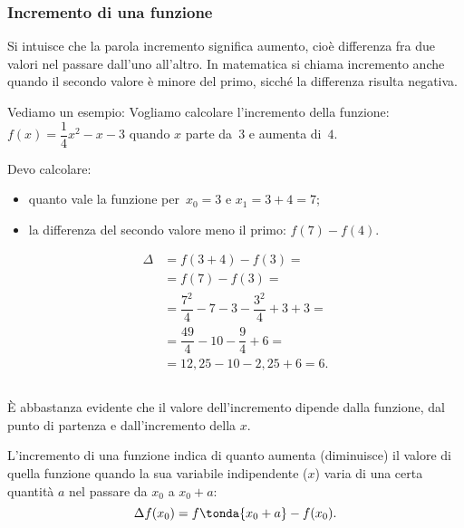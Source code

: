 \subsubsection{Incremento di una funzione}
\label{subsubsec:diff01_incremento}
    

Si intuisce che la parola incremento significa aumento, cioè differenza fra due 
valori nel passare dall'uno all'altro. In matematica si chiama incremento anche 
quando il secondo valore è minore del primo, sicché la differenza risulta 
negativa.

\begin{minipage}{.48 \textwidth}
Vediamo un esempio: 
Vogliamo calcolare l'incremento della 
funzione:~\(f(x) = \dfrac{1}{4} x^2 -x -3\)
quando \(x\) parte da~\(3\) e aumenta di~\(4\).

Devo calcolare:
\begin {itemize}[nosep, noitemsep]
 \item quanto vale la funzione per~$x_0=3$ e $x_1=3+4=7$;
 \item la differenza del secondo valore meno il primo: $f(7)-f(4)$.
\end {itemize}
 
\begin{align*}
 \Delta &= f(3+4) - f(3) = \\
        &= f(7) - f(3) = \\
        &= \dfrac{7^2}{4}  -7 -3 - \dfrac{3^2}{4}  +3 +3 =\\
        &= \dfrac{49}{4} -10 - \dfrac{9}{4} +6 =\\
        &= 12,25 -10 - 2,25 +6 = 6.
\end{align*}

\[\]
\end{minipage}
 \hfill
\begin{minipage}{.48 \textwidth}
 \begin{center}
\incremento
 \end{center}
\end{minipage}

È abbastanza evidente che il valore dell'incremento dipende dalla funzione, 
dal punto di partenza e dall'incremento della $x$.

\begin{definizione}
 L'incremento di una funzione indica di quanto aumenta (diminuisce) il valore 
di 
quella funzione quando la sua variabile indipendente (\(x\)) varia di una certa 
quantità $a$ nel passare da $x_0$ a $x_0+a$:
\[
\Delta f(x_0) = f \tonda{x_0 + a} - f(x_0).
\]
\end{definizione}


